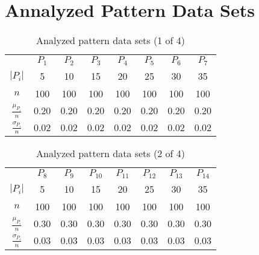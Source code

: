 \documentclass[anon]{CI}
\begin{document}


\pagebreak

\appendix

\section{Annalyzed Pattern Data Sets}\label{AppA}



\begin{table}[H]
	\centering
	\def\arraystretch{1.5}
	\begin{tabular}{cccccccc}
		
		& $P_{1}$  & $P_{2}$  & $P_{3}$  & $P_{4}$  & $P_{5}$  & $P_{6}$  & $P_{7}$  \\ \cline{2-8}
		$\left|P_i\right|$  & 5  & 10  & 15  & 20  & 25  & 30  & 35 \\
		$n$  & 100  & 100  & 100  & 100  & 100  & 100  & 100 \\
		$\frac{\mu_{P_i}}{n}$  & $0.20$  & $0.20$  & $0.20$  & $0.20$  & $0.20$  & $0.20$  & $0.20$ \\
		$\frac{\sigma_{P_i}}{n}$  & $0.02$  & $0.02$  & $0.02$  & $0.02$  & $0.02$  & $0.02$  & $0.02$ 
	\end{tabular}
	\caption{Analyzed pattern data sets (1 of 4)}
\end{table}


\begin{table}[H]
	\centering
	\def\arraystretch{1.5}
	\begin{tabular}{cccccccc}
		
		& $P_{8}$  & $P_{9}$  & $P_{10}$  & $P_{11}$  & $P_{12}$  & $P_{13}$  & $P_{14}$  \\ \cline{2-8}
		$\left|P_i\right|$  & 5  & 10  & 15  & 20  & 25  & 30  & 35 \\
		$n$  & 100  & 100  & 100  & 100  & 100  & 100  & 100 \\
		$\frac{\mu_{P_i}}{n}$  & $0.30$  & $0.30$  & $0.30$  & $0.30$  & $0.30$  & $0.30$  & $0.30$ \\
		$\frac{\sigma_{P_i}}{n}$  & $0.03$  & $0.03$  & $0.03$  & $0.03$  & $0.03$  & $0.03$  & $0.03$ 
	\end{tabular}
	\caption{Analyzed pattern data sets (2 of 4)}
\end{table}
\end{document}
